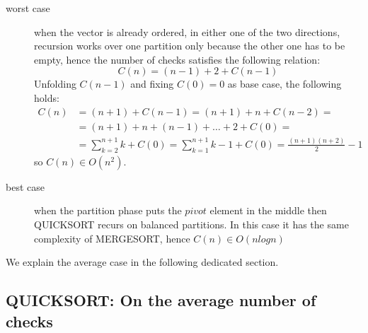\begin{description}
\item[worst case] when the vector is already ordered, in either one of the
  two directions, recursion works over one partition only because the
  other one has to be empty, hence the number of checks satisfies
  the following relation:
  \begin{displaymath}
    C(n) = (n-1)+2 + C(n-1)
  \end{displaymath}
  Unfolding $C(n-1)$ and fixing $C(0) = 0$ as base case, the following holds:
  \begin{displaymath}
    \begin{split}
      C(n) &= (n+1) + C(n-1) = (n+1) + n + C(n-2) = \\
      &= (n+1) + n + (n-1) + \ldots + 2 + C(0) = \\
      &= \sum_{k=2}^{n+1}{k} + C(0) = \sum_{k=1}^{n+1}{k} -1 + C(0) =
      \frac{(n+1)(n+2)}{2} - 1
    \end{split}
  \end{displaymath}
  so $C(n) \in O(n^2)$.
\item[best case] when the partition phase puts the $pivot$ element
    in the middle then QUICKSORT recurs on balanced partitions. In this
  case it has the same complexity of MERGESORT, hence $C(n) \in O(n
  logn)$
\end{description}
We explain the average case in the following dedicated section.

\subsection{QUICKSORT: On the average number of checks}

